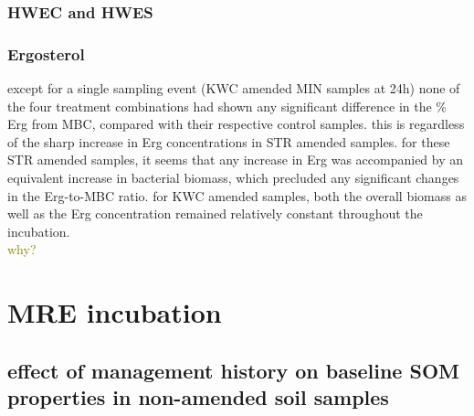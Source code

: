 \documentclass[12pt]{report}
\newcommand{\myGreen}[1]{\textcolor{olive}{#1}} %
\begin{document}
		\subsubsection{HWEC and HWES}
			
			
		\subsubsection{Ergosterol}
			
			except for a single sampling event (KWC amended MIN samples at 24h) none of the four treatment combinations had shown any significant difference in the \% Erg from MBC, compared with their respective control samples. this is regardless of the sharp increase in Erg concentrations in STR amended samples. for these STR amended samples, it seems that any increase in Erg was accompanied by an equivalent increase in bacterial biomass, which precluded any significant changes in the Erg-to-MBC ratio. for KWC amended samples, both the overall biomass as well as the Erg concentration remained relatively constant throughout the incubation. \\
			\myGreen{why?}
			
			
			   
			
			
\section{MRE incubation}

	\subsection{effect of management history on baseline SOM properties in non-amended soil samples}
		
\end{document}
